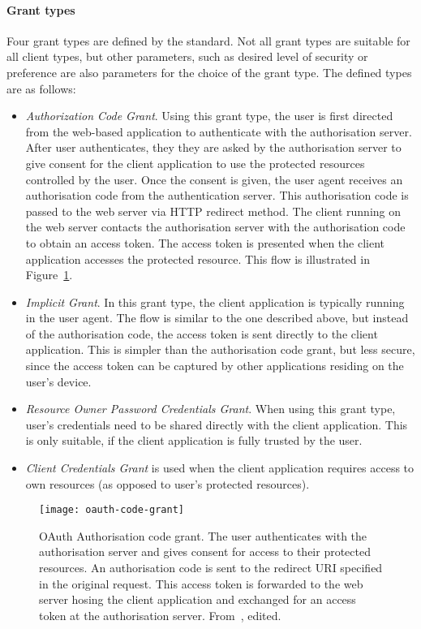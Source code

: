 \paragraph{Grant types} Four grant types are defined by the standard. Not all grant types are suitable for all client types, but other parameters, such as desired level of security or preference are also parameters for the choice of the grant type. The defined types are as follows:

\begin{itemize}[noitemsep]
    \item \textit{Authorization Code Grant}. Using this grant type, the user is first directed from the web-based application to authenticate with the authorisation server. After user authenticates, they they are asked by the authorisation server to give consent for the client application to use the protected resources controlled by the user. Once the consent is given, the user agent receives an authorisation code from the authentication server. This authorisation code is passed to the web server via HTTP redirect method. The client running on the web server contacts the authorisation server with the authorisation code to obtain an access token. The access token is presented when the client application accesses the protected resource. This flow is illustrated in Figure~\ref{fig:oauth-code-grant}.
    \item \textit{Implicit Grant}. In this grant type, the client application is typically running in the user agent. The flow is similar to the one described above, but instead of the authorisation code, the access token is sent directly to the client application. This is simpler than the authorisation code grant, but less secure, since the access token can be captured by other applications residing on the user's device.
    \item \textit{Resource Owner Password Credentials Grant}. When using this grant type, user's credentials need to be shared directly with the client application. This is only suitable, if the client application is fully trusted by the user.
    \item \textit{Client Credentials Grant} is used when the client application requires access to own resources (as opposed to user's protected resources).
\end{itemize}

\begin{figure}[ht]
    \centering
    \texttt{[image: oauth-code-grant]}
    \caption{OAuth Authorisation code grant. The user authenticates with the authorisation server and gives consent for access to their protected resources. An authorisation code is sent to the redirect URI specified in the original request. This access token is forwarded to the web server hosing the client application and exchanged for an access token at the authorisation server. From~\cite{Hardt2012TheFramework}, edited.}
    \label{fig:oauth-code-grant}
\end{figure}

